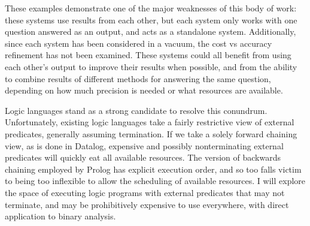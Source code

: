 These examples demonstrate one of the major weaknesses of this body of work: these systems use results from each other, but each system only works with one question answered as an output, and acts as a standalone system.
Additionally, since each system has been considered in a vacuum, the cost vs accuracy refinement has not been examined.
These systems could all benefit from using each other's output to improve their results when possible, and from the ability to combine results of different methods for answering the same question, depending on how much precision is needed or what resources are available.

Logic languages stand as a strong candidate to resolve this conundrum. Unfortunately, existing logic languages take a fairly restrictive view of external predicates, generally assuming termination.
If we take a solely forward chaining view, as is done in Datalog, expensive and possibly nonterminating external predicates will quickly eat all available resources.
The version of backwards chaining employed by Prolog has explicit execution order, and so too falls victim to being too inflexible to allow the scheduling of available resources.
I will explore the space of executing logic programs with external predicates that may not terminate, and may be prohibitively expensive to use everywhere, with direct application to binary analysis.

